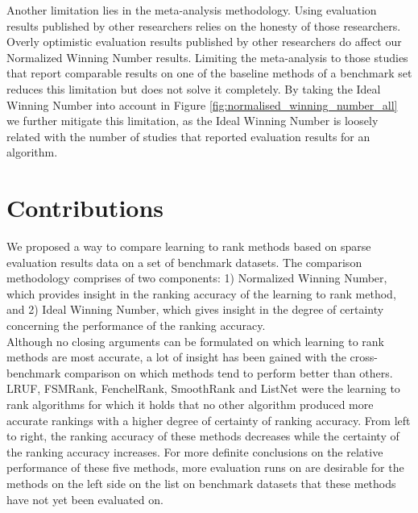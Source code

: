 \documentclass{sig-alternate-2013}
\begin{document}
Another limitation lies in the meta-analysis methodology. Using evaluation results published by other researchers relies on the honesty of those researchers. Overly optimistic evaluation results published by other researchers do affect our Normalized Winning Number results. Limiting the meta-analysis to those studies that report comparable results on one of the baseline methods of a benchmark set reduces this limitation but does not solve it completely. By taking the Ideal Winning Number into account in Figure \ref{fig:normalised_winning_number_all} we further mitigate this limitation, as the Ideal Winning Number is loosely related with the number of studies that reported evaluation results for an algorithm.

\section{Contributions}
We proposed a way to compare learning to rank methods based on sparse evaluation results data on a set of benchmark datasets. The comparison methodology comprises of two components: 1) Normalized Winning Number, which provides insight in the ranking accuracy of the learning to rank method, and 2) Ideal Winning Number, which gives insight in the degree of certainty concerning the performance of the ranking accuracy.\\

Although no closing arguments can be formulated on which learning to rank methods are most accurate, a lot of insight has been gained with the cross-benchmark comparison on which methods tend to perform better than others. LRUF, FSMRank, FenchelRank, SmoothRank and ListNet were the learning to rank algorithms for which it holds that no other algorithm produced more accurate rankings with a higher degree of certainty of ranking accuracy. From left to right, the ranking accuracy of these methods decreases while the certainty of the ranking accuracy increases. For more definite conclusions on the relative performance of these five methods, more evaluation runs on are desirable for the methods on the left side on the list on benchmark datasets that these methods have not yet been evaluated on.\\


%

%
%
\onecolumn
\clearpage
\newpage
\appendix
\end{document}
